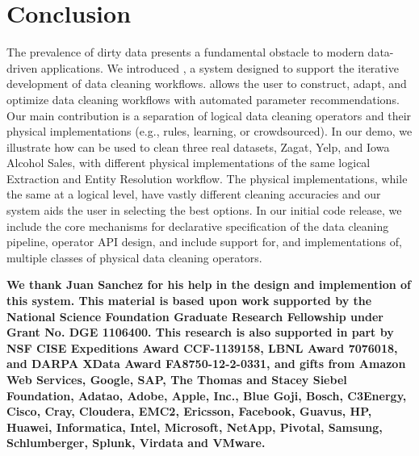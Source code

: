 \section{Conclusion}
The prevalence of dirty data presents a fundamental obstacle to modern data-driven applications.
We introduced \sys, a system designed to support the iterative development of data cleaning workflows.
\sys allows the user to construct, adapt, and optimize data cleaning workflows with automated parameter recommendations.
Our main contribution is a separation of logical data cleaning operators and their physical implementations (e.g., rules, learning, or crowdsourced).
In our demo, we illustrate how \sys can be used to clean three real datasets, Zagat, Yelp, and Iowa Alcohol Sales, with different physical implementations of the same logical Extraction and Entity Resolution workflow.
The physical implementations, while the same at a logical level, have vastly different cleaning accuracies and our system aids the user in selecting the best options.
In our initial code release, we include the core mechanisms for declarative specification of the data cleaning pipeline, operator API design, and include support for, and implementations of, multiple classes of physical data cleaning operators.

\vspace{0.5em}

\scriptsize\textbf{We thank Juan Sanchez for his help in the design and implemention of this system. This material is based upon work supported by the National Science Foundation Graduate Research Fellowship under Grant No. DGE 1106400. This research is also supported in part by NSF CISE Expeditions Award CCF-1139158, LBNL Award 7076018, and DARPA XData Award FA8750-12-2-0331, and gifts from Amazon Web Services, Google, SAP, The Thomas and Stacey Siebel Foundation, Adatao, Adobe, Apple, Inc., Blue Goji, Bosch, C3Energy, Cisco, Cray, Cloudera, EMC2, Ericsson, Facebook, Guavus, HP, Huawei, Informatica, Intel, Microsoft, NetApp, Pivotal, Samsung, Schlumberger, Splunk, Virdata and VMware.}